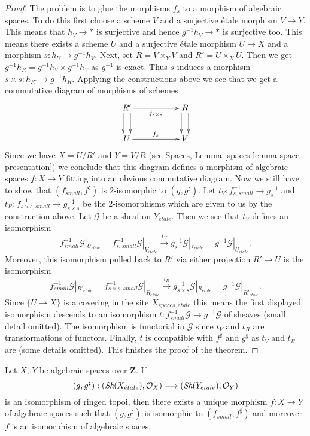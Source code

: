 \begin{proof}
\medskip\noindent
The problem is to glue the morphisms $f_s$ to a morphism of algebraic
spaces. To do this first choose a scheme $V$ and a surjective \'etale
morphism $V \to Y$. This means that $h_V \to *$ is surjective and hence
$g^{-1}h_V \to *$ is surjective too. This means there exists a scheme $U$
and a surjective \'etale morphism $U \to X$ and a morphism
$s : h_U \to g^{-1}h_V$. Next, set $R = V \times_Y V$ and
$R' = U \times_X U$. Then we get
$g^{-1}h_R = g^{-1}h_V \times g^{-1}h_V$ as $g^{-1}$ is exact.
Thus $s$ induces a morphism $s \times s : h_{R'} \to g^{-1}h_R$.
Applying the constructions above we see that we get a
commutative diagram of morphisms of schemes
$$
\xymatrix{
R' \ar@<1ex>[d] \ar@<-1ex>[d] \ar[rr]_{f_{s \times s}} & &
R \ar@<1ex>[d] \ar@<-1ex>[d] \\
U \ar[rr]^{f_s} & &
V
}
$$
Since we have $X = U/R'$ and $Y = V/R$ (see
Spaces, Lemma \ref{spaces-lemma-space-presentation})
we conclude that this diagram
defines a morphism of algebraic spaces $f : X \to Y$ fitting
into an obvious commutative diagram.
Now we still have to show that $(f_{small}, f^\sharp)$ is
$2$-isomorphic to $(g, g^\sharp)$.
Let $t_V : f_{s, small}^{-1} \to g_s^{-1}$ and
$t_R : f_{s \times s, small}^{-1} \to g_{s \times s}^{-1}$ be
the $2$-isomorphisms which are given to us by the construction above.
Let $\mathcal{G}$ be a sheaf on $Y_{\acute{e}tale}$. Then we see that
$t_V$ defines an isomorphism
$$
f_{small}^{-1}\mathcal{G}|_{U_{\acute{e}tale}}
=
f_{s, small}^{-1}\mathcal{G}|_{V_{\acute{e}tale}}
\xrightarrow{t_V}
g_s^{-1}\mathcal{G}|_{V_{\acute{e}tale}}
=
g^{-1}\mathcal{G}|_{U_{\acute{e}tale}}.
$$
Moreover, this isomorphism pulled back to $R'$ via either projection
$R' \to U$ is the isomorphism
$$
f_{small}^{-1}\mathcal{G}|_{R'_{\acute{e}tale}}
=
f_{s \times s, small}^{-1}\mathcal{G}|_{R_{\acute{e}tale}}
\xrightarrow{t_R}
g_{s \times s}^{-1}\mathcal{G}|_{R_{\acute{e}tale}}
=
g^{-1}\mathcal{G}|_{R'_{\acute{e}tale}}.
$$
Since $\{U \to X\}$ is a covering in the site $X_{spaces, \acute{e}tale}$
this means the first displayed isomorphism descends to an isomorphism
$t : f_{small}^{-1}\mathcal{G} \to g^{-1}\mathcal{G}$
of sheaves (small detail omitted). The isomorphism is functorial
in $\mathcal{G}$ since $t_V$ and $t_R$ are transformations of functors.
Finally, $t$ is compatible with $f^\sharp$ and $g^\sharp$ as
$t_V$ and $t_R$ are (some details omitted).
This finishes the proof of the theorem.
\end{proof}

\begin{lemma}
\label{lemma-isomorphism-ringed-topoi}
Let $X$, $Y$ be algebraic spaces over $\mathbf{Z}$. If
$$
(g, g^\sharp) :
(\mathop{\textit{Sh}}\nolimits(X_{\acute{e}tale}), \mathcal{O}_X)
\longrightarrow
(\mathop{\textit{Sh}}\nolimits(Y_{\acute{e}tale}), \mathcal{O}_Y)
$$
is an isomorphism of ringed topoi, then there exists a unique
morphism $f : X \to Y$ of algebraic spaces such that
$(g, g^\sharp)$ is isomorphic to $(f_{small}, f^\sharp)$
and moreover $f$ is an isomorphism of algebraic spaces.
\end{lemma}

